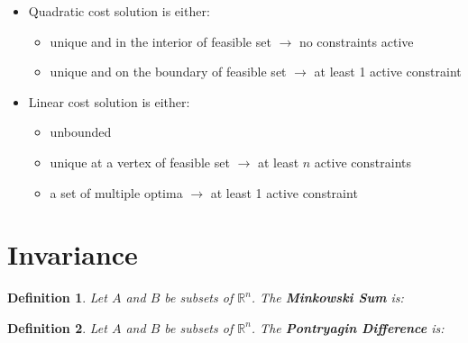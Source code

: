 \documentclass[8pt,a4paper]{scrartcl}
\newtheorem{define}{Definition}
\begin{document}
\begin{multicols*}{3}
\begin{multicols*}{4}
{\begin{itemize}
\item Quadratic cost solution is either:
\begin{itemize}
\item unique and in the interior of feasible set $\rightarrow$ no constraints active
\item unique and on the boundary of feasible set $\rightarrow$ at least 1 active constraint
\end{itemize}
\item Linear cost solution is either:
\begin{itemize}
\item unbounded
\item unique at a vertex of feasible set $\rightarrow$ at least $n$ active constraints
\item a set of multiple optima $\rightarrow$ at least 1 active constraint
\end{itemize}
\end{itemize}
}%

\section{Invariance}

\begin{define}
Let $A$ and $B$ be subsets of $\mathbb{R}^n$. The \textbf{Minkowski Sum} is:


\end{define}

\begin{define}
Let $A$ and $B$ be subsets of $\mathbb{R}^n$. The \textbf{Pontryagin Difference} is:


\end{define}

\end{multicols*}
\end{multicols*}
\end{document}
